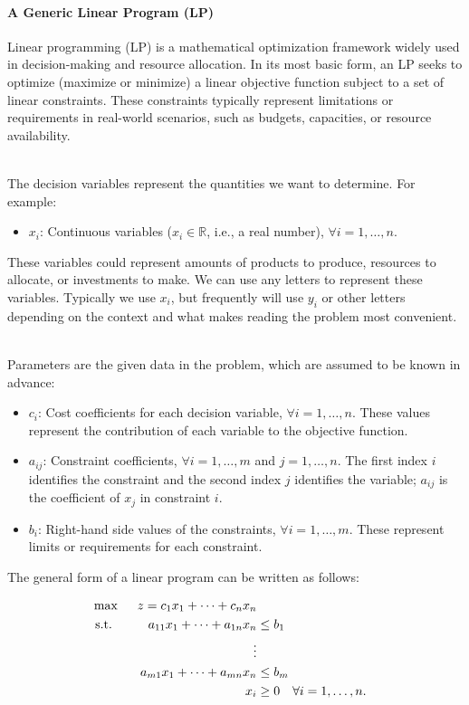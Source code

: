 \paragraph{A Generic Linear Program (LP)}

Linear programming (LP) is a mathematical optimization framework widely used in decision-making and resource allocation. In its most basic form, an LP seeks to optimize (maximize or minimize) a linear objective function subject to a set of linear constraints. These constraints typically represent limitations or requirements in real-world scenarios, such as budgets, capacities, or resource availability.

\smallskip {}\\
The decision variables represent the quantities we want to determine. For example:
\begin{itemize}
    \item $x_i$: Continuous variables ($x_i \in \mathbb{R}$, i.e., a real number), $\forall i = 1,\dots,n$.
\end{itemize}
These variables could represent amounts of products to produce, resources to allocate, or investments to make.  We can use any letters to represent these variables.  Typically we use $x_i$, but frequently will use $y_i$ or other letters depending on the context and what makes reading the problem most convenient.

\smallskip {}\\
Parameters are the given data in the problem, which are assumed to be known in advance:
\begin{itemize}
    \item $c_i$: Cost coefficients for each decision variable, $\forall i = 1,\dots,n$. These values represent the contribution of each variable to the objective function.
    \item $a_{ij}$: Constraint coefficients, $\forall i = 1,\dots,m$ and $j = 1,\dots,n$. The first index $i$ identifies the constraint and the second index $j$ identifies the variable; $a_{ij}$ is the coefficient of $x_j$ in constraint $i$.
    \item $b_i$: Right-hand side values of the constraints, $\forall i = 1,\dots,m$. These represent limits or requirements for each constraint.
\end{itemize}

The general form of a linear program can be written as follows:

\begin{equation}
\begin{aligned}
\max\;\;&& z = c_1x_1 + \dots + c_nx_n \\
\text{ s.t. }\;\;&& a_{11}x_1 + \dots + a_{1n}x_n &\leq b_1 \\
&& \hspace*{0.5in}\vdots \\
&& a_{m1}x_1 + \dots + a_{mn}x_n &\leq b_m \\
&& x_i &\geq 0 \quad \forall i=1, \dots, n.
\end{aligned}
\label{eqn:GeneralLPMax}
\end{equation}

